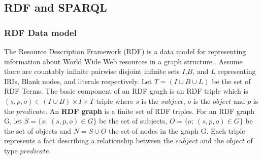 
\subsection{RDF and SPARQL}
\subsubsection{RDF Data model}
The Resource Description Framework (RDF) is a data model for representing information about World Wide Web resources in a graph structure.\cite{perez2006semantics}. Assume there are  countably infinite pairwise disjoint infinite sets $I$,$B$, and $L$ representing  IRIs, Blank nodes, and literals respectively. Let $T = (I \cup B \cup L)$ be the set of RDF Terms. The basic component of an RDF gragh is an RDF triple which is $(s,p,o) \in (I \cup B) \times I \times T $ triple where $s$ is the $subject$, $o$ is the $object$ and $p$ is the $predicate$.  An \textbf{RDF graph} is a finite set of RDF triples. %
For an RDF graph G, let $S = \{s;\ (s, p, o) \in G\}$ be the set of subjects, $O = \{o;\ (s, p, o) \in G\}$ be the set of objects and $N = S \cup O$ the set of nodes in the graph G. Each triple represents a fact describing a relationship between the $subject$ and the $object$ of type $predicate$.

